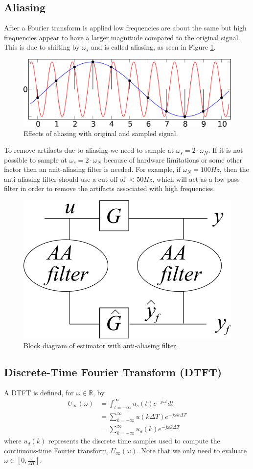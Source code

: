 \documentclass[lecture,12pt,]{pcms-l}
\theoremstyle{example}
\newcommand{\tint}{\int_{t=-\infty}^\infty}
\newcommand{\w}{\omega}
\newcommand{\emjwt}{e^{-j\omega t}}
\begin{document}
\subsection{Aliasing}
After a Fourier transform is applied low frequencies are about the same but high frequencies appear to have a larger magnitude compared to the original signal. This is due to shifting by $\w_s$ and is called aliasing, as seen in Figure \ref{fig:02aliasingSines}.
\begin{figure}[ht!]
	\centering
	\includegraphics[width=.5\textwidth]{images/02aliasingSines}
	\caption{Effects of aliasing with original and sampled signal.}
	\label{fig:02aliasingSines}
\end{figure}

To remove artifacts due to aliasing we need to sample at $\w_s = 2\cdot\w_N$. If it is not possible to sample at $\w_s = 2\cdot\w_N$ because of hardware limitations or some other factor then an anit-aliasing filter is needed. For example, if $\w_N = 100 Hz$, then the anti-aliasing filter should use a cut-off of $< 50 Hz$, which will act as a low-pass filter in order to remove the artifacts associated with high frequencies.
\begin{figure}[ht!]
	\centering
	\includegraphics[width=.25\textwidth]{images/02aafilter}
	\caption{Block diagram of estimator with anti-aliasing filter.}
	\label{fig:02aafilter}
\end{figure}

\subsection{Discrete-Time Fourier Transform (DTFT)}
A DTFT is defined, for $\w\in\mathbb{R}$, by
\begin{align*}
U_\infty(\w) &= \tint u_s(t)\emjwt dt \\
&= \sum_{k=-\infty}^\infty u(k\Delta T) e^{-j\w k\Delta T} \\
&= \sum_{k=-\infty}^\infty u_d(k) e^{-j\w k\Delta T}
\end{align*}
where $u_d(k)$ represents the discrete time samples used to compute the continuous-time Fourier transform, $U_\infty(\w)$. Note that we only need to evaluate $\w\in[0, \frac{\pi}{\Delta T}]$.
\end{document}
